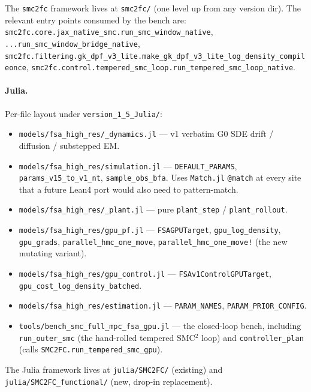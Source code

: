 \documentclass[11pt,a4paper]{article}
\begin{document}
The \texttt{smc2fc} framework lives at \texttt{smc2fc/} (one level
up from any version dir). The relevant entry points consumed by
the bench are: \texttt{smc2fc.core.jax\_native\_smc.run\_smc\_window\_native},
\texttt{...run\_smc\_window\_bridge\_native},
\texttt{smc2fc.filtering.gk\_dpf\_v3\_lite.make\_gk\_dpf\_v3\_lite\_log\_density\_compileonce},
\texttt{smc2fc.control.tempered\_smc\_loop.run\_tempered\_smc\_loop\_native}.

\paragraph{Julia.} Per-file layout under
\texttt{version\_1\_5\_Julia/}:

\begin{itemize}[itemsep=2pt]
  \item \texttt{models/fsa\_high\_res/\_dynamics.jl} --- v1
        verbatim G0 SDE drift / diffusion / substepped EM.
  \item \texttt{models/fsa\_high\_res/simulation.jl} ---
        \texttt{DEFAULT\_PARAMS},
        \texttt{params\_v15\_to\_v1\_nt}, \texttt{sample\_obs\_bfa}.
        Uses \texttt{Match.jl} \texttt{@match} at every site that
        a future Lean4 port would also need to pattern-match.
  \item \texttt{models/fsa\_high\_res/\_plant.jl} --- pure
        \texttt{plant\_step} / \texttt{plant\_rollout}.
  \item \texttt{models/fsa\_high\_res/gpu\_pf.jl} ---
        \texttt{FSAGPUTarget}, \texttt{gpu\_log\_density},
        \texttt{gpu\_grads}, \texttt{parallel\_hmc\_one\_move},
        \texttt{parallel\_hmc\_one\_move!} (the new mutating
        variant).
  \item \texttt{models/fsa\_high\_res/gpu\_control.jl} ---
        \texttt{FSAv1ControlGPUTarget},
        \texttt{gpu\_cost\_log\_density\_batched}.
  \item \texttt{models/fsa\_high\_res/estimation.jl} ---
        \texttt{PARAM\_NAMES}, \texttt{PARAM\_PRIOR\_CONFIG}.
  \item \texttt{tools/bench\_smc\_full\_mpc\_fsa\_gpu.jl} --- the
        closed-loop bench, including \texttt{run\_outer\_smc}
        (the hand-rolled tempered SMC$^2$ loop) and
        \texttt{controller\_plan} (calls
        \texttt{SMC2FC.run\_tempered\_smc\_gpu}).
\end{itemize}

The Julia framework lives at \texttt{julia/SMC2FC/} (existing) and
\texttt{julia/SMC2FC\_functional/} (new, drop-in replacement).
\end{document}
